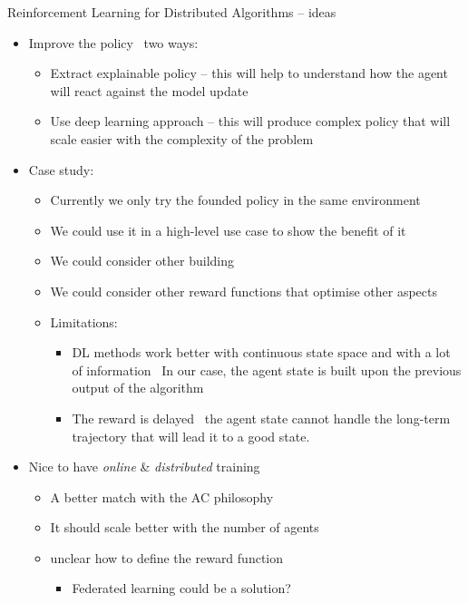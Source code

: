 \documentclass[presentation, 9pt]{beamer}\mode<presentation>{\usetheme{AMSBolognaFC}}
\begin{document}
\begin{frame}{Reinforcement Learning for Distributed Algorithms -- ideas}
\begin{itemize}
	\item Improve the policy \faArrowRight \, two ways:
	\begin{itemize}
		\item Extract explainable policy -- this will help to understand how the agent will react against the model update
		\item Use deep learning approach -- this will produce complex policy that will scale easier with the complexity of the problem
	\end{itemize}
	\item Case study:
	\begin{itemize}
		\item Currently we only try the founded policy in the same environment
		\item We could use it in a high-level use case to show the benefit of it
		\item We could consider other building
		\item We could consider other reward functions that optimise other aspects
		\item Limitations:
		\begin{itemize}
			\item DL methods work better with	continuous state space and with a lot of information \faArrowRight \, In our case, the agent state is built upon the previous output of the algorithm
			\item The reward is delayed \faArrowRight \, the agent state cannot handle the long-term trajectory that will lead it to a good state.
		\end{itemize}
	\end{itemize}
	\item Nice to have \emph{online} \& \emph{distributed} training
	\begin{itemize}
		\item A better match with the AC philosophy
		\item It should scale better with the number of agents
		\item[\faThumbsDown] unclear how to define the reward function
		\begin{itemize}
			\item Federated learning could be a solution?
		\end{itemize}
	\end{itemize}
\end{itemize}
\end{frame}
\end{document}
